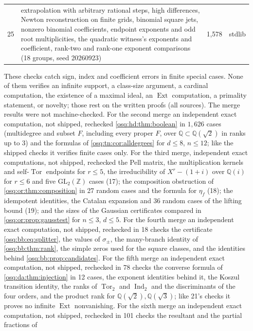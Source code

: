 \documentclass[11pt,letterpaper]{article}
\numberwithin{equation}{section}
\theoremstyle{definition}
\theoremstyle{remark}
\theoremstyle{plain}
\newcommand{\Z}{\mathbb Z}
\newcommand{\Q}{\mathbb Q}
\newcommand{\Tor}{\operatorname{Tor}}
\newcommand{\Ext}{\operatorname{Ext}}
\begin{document}
\begin{longtable}{@{}l>{\raggedright\arraybackslash}p{}rl@{}}
25 & extrapolation with arbitrary rational steps, high differences, Newton reconstruction on finite grids, binomial square jets, nonzero binomial coefficients, endpoint exponents and odd root multiplicities, the quadratic witness's exponents and coefficient, rank-two and rank-one exponent comparisons (18 groups, seed 20260923) & 1{,}578 & stdlib\\
\end{longtable}
\endgroup

These checks catch sign, index and coefficient errors in finite special cases. None of them
verifies an infinite support, a class-size argument, a cardinal computation, the existence of a
maximal ideal, an $\Ext$ computation, a primality statement, or novelty; those rest on the written
proofs (all sources). The merge results were not machine-checked. For the second merge an independent exact
computation, not shipped, rechecked \cref{osq:hd:thm:boolean} in $1{,}626$ cases (multidegree and subset $F$, including
every proper $F$, over $\Q\subset\Q(\sqrt2)$ in ranks up to $3$) and the formulas of \cref{osq:tn:cor:alldegrees} for
$d\le8$, $n\le12$; like the shipped checks it verifies finite cases only. For the third merge, independent exact computations, not
shipped, rechecked the Pell matrix, the multiplication kernels and self-$\Tor$ endpoints for $r\le5$, the irreducibility of $X^r-(1+i)$ over
$\Q(i)$ for $r\le6$ and five $\mathrm{GL}_2(\Z)$ cases (17); the composition obstruction of \cref{osq:or:thm:composition} in 27 random cases and
the formula for $\eta_f$ (18); the idempotent identities, the Catalan expansion and 36 random cases of the lifting bound (19); and the sizes
of the Gaussian certificates compared in \cref{osq:or:prop:gausstest} for $n\le3$, $d\le5$. For the fourth merge an independent exact
computation, not shipped, rechecked in 18 checks the certificate \eqref{osq:bb:eq:splitter}, the values of $\sigma_\pm$, the many-branch identity
of \cref{osq:bb:thm:rank}, the simple zeros used for the square classes, and the identities behind \cref{osq:bb:prop:candidates}. For the
fifth merge an independent exact computation, not shipped, rechecked in 78 checks the converse formula of \cref{osq:da:thm:injection} in 12
cases, the exponent identities behind it, the Koszul transition identity, the ranks of $\Tor_2$ and $\operatorname{Ind}_2$ and the
discriminants of the four orders, and the product rank for $\Q(\sqrt2),\Q(\sqrt3)$; like 21's checks it proves no infinite $\Ext$
nonvanishing. For the sixth merge an independent exact computation, not shipped, rechecked in 101 checks the resultant and the partial fractions of
\end{document}
